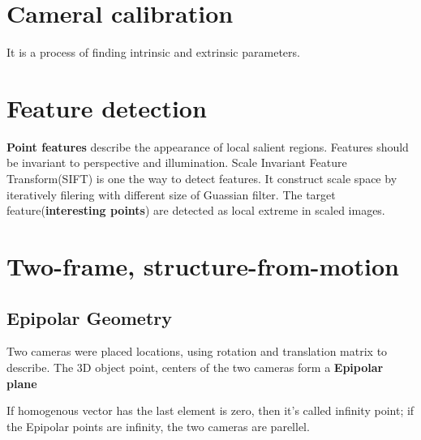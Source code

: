 \documentclass{article}
\begin{document}
\section{Cameral calibration}
It is a process of finding intrinsic and extrinsic parameters.
\section{Feature detection}
\textbf{Point features} describe the appearance of local salient regions. Features should be invariant to perspective and illumination.
Scale Invariant Feature Transform(SIFT) is one the way to detect features. It construct scale space by iteratively filering with different size of Guassian filter. The target feature(\textbf{interesting points}) are detected as local extreme in scaled images.
\section{Two-frame, structure-from-motion}
\subsection{Epipolar Geometry}
Two cameras were placed locations, using rotation and translation matrix to describe. The 3D object point, centers of the two cameras form a \textbf{Epipolar plane}

If homogenous vector has the last element is zero, then it's called infinity point; if the Epipolar points are infinity, the two cameras are parellel.
\end{document}
